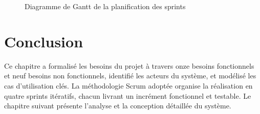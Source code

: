 \begin{figure}[H]
    \centering
    \caption{Diagramme de Gantt de la planification des sprints}
    \label{fig:gantt}
\end{figure}


\section*{Conclusion}

Ce chapitre a formalisé les besoins du projet à travers onze besoins fonctionnels et neuf
besoins non fonctionnels, identifié les acteurs du système, et modélisé les cas d'utilisation
clés. La méthodologie Scrum adoptée organise la réalisation en quatre sprints itératifs,
chacun livrant un incrément fonctionnel et testable. Le chapitre suivant présente l'analyse
et la conception détaillée du système.
